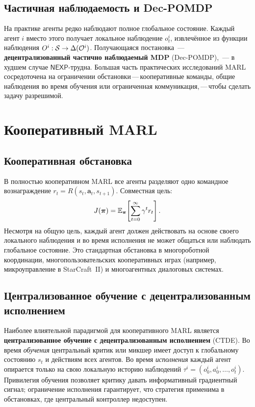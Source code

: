 \subsection{Частичная наблюдаемость и Dec-POMDP}

На практике агенты редко наблюдают полное глобальное состояние. Каждый агент
$i$ вместо этого получает локальное наблюдение $o^i_t$, извлечённое из
функции наблюдения $O^i : \mathcal{S} \to \Delta(\mathcal{O}^i)$. Получающаяся
постановка~--- \textbf{децентрализованный частично наблюдаемый
MDP} (Dec-POMDP),~--- в худшем случае $\mathsf{NEXP}$-трудна.
Большая часть практических исследований MARL сосредоточена на
ограничении обстановки\,---\,кооперативные команды, общие наблюдения
во время обучения или ограниченная коммуникация,\,---\,чтобы сделать задачу
разрешимой.

\section{Кооперативный MARL}
\label{sec:cooperative}

\subsection{Кооперативная обстановка}

В полностью кооперативном MARL все агенты разделяют одно командное вознаграждение
$r_t = R(s_t, \bm{a}_t, s_{t+1})$. Совместная цель:
\begin{equation}
\label{eq:cooperative-return}
J(\boldsymbol{\pi}) = \operatorname{\mathbb{E}}_{\boldsymbol{\pi}}\!\left[
  \sum_{t=0}^{\infty} \gamma^t r_t \right].
\end{equation}
Несмотря на общую цель, каждый агент должен действовать на основе своего
локального наблюдения и во время исполнения не может общаться или
наблюдать глобальное состояние. Это стандартная обстановка в
многороботной координации, многопользовательских кооперативных играх (например,
микроуправление в StarCraft~II) и многоагентных диалоговых системах.

\subsection{Централизованное обучение с децентрализованным исполнением}

Наиболее влиятельной парадигмой для кооперативного MARL является
\textbf{централизованное обучение с децентрализованным
исполнением}
(CTDE).
Во время \emph{обучения} центральный критик или микшер имеет доступ к
глобальному состоянию $s_t$ и действиям всех агентов. Во время
\emph{исполнения} каждый агент опирается только на свою локальную историю наблюдений
$\tau^i = (o^i_0, a^i_0, \ldots, o^i_t)$. Привилегия обучения позволяет критику
давать информативный градиентный сигнал; ограничение исполнения гарантирует,
что стратегия применима в обстановках, где центральный
контроллер недоступен.


